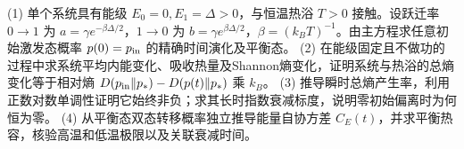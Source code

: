 (1) 单个系统具有能级 \(E_0=0,E_1=\Delta>0\)，与恒温热浴 \(T>0\) 接触。设跃迁率 \(0\to1\) 为 \(a=\gamma e^{-\beta\Delta/2}\)，\(1\to0\) 为 \(b=\gamma e^{\beta\Delta/2}\)，\(\beta=(k_BT)^{-1}\)。由主方程求任意初始激发态概率 \(p(0)=p_{\rm in}\) 的精确时间演化及平衡态。
(2) 在能级固定且不做功的过程中求系统平均内能变化、吸收热量及Shannon熵变化，证明系统与热浴的总熵变化等于相对熵 \(D(p_{\rm in}\Vert p_*)-D(p(t)\Vert p_*)\) 乘 \(k_B\)。
(3) 推导瞬时总熵产生率，利用正数对数单调性证明它始终非负；求其长时指数衰减标度，说明零初始偏离时为何恒为零。
(4) 从平衡态双态转移概率独立推导能量自协方差 \(C_E(t)\)，并求平衡热容，核验高温和低温极限以及关联衰减时间。
